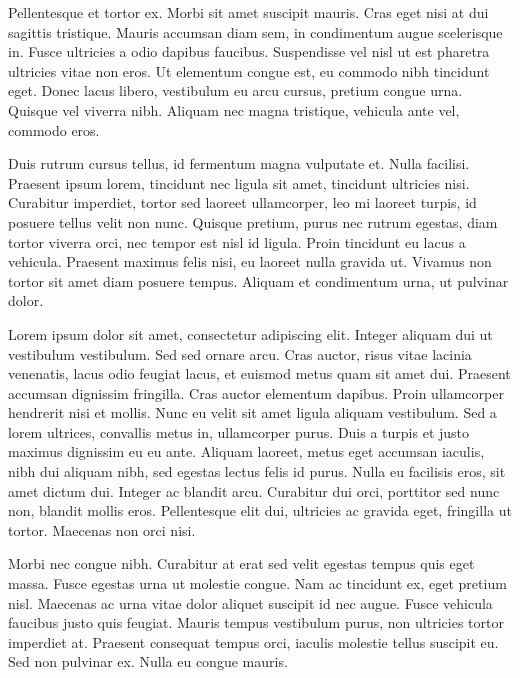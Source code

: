 Pellentesque et tortor ex. Morbi sit amet suscipit mauris. Cras eget nisi at dui sagittis tristique. Mauris accumsan diam sem, in condimentum augue scelerisque in. Fusce ultricies a odio dapibus faucibus. Suspendisse vel nisl ut est pharetra ultricies vitae non eros. Ut elementum congue est, eu commodo nibh tincidunt eget. Donec lacus libero, vestibulum eu arcu cursus, pretium congue urna. Quisque vel viverra nibh. Aliquam nec magna tristique, vehicula ante vel, commodo eros.

Duis rutrum cursus tellus, id fermentum magna vulputate et. Nulla facilisi. Praesent ipsum lorem, tincidunt nec ligula sit amet, tincidunt ultricies nisi. Curabitur imperdiet, tortor sed laoreet ullamcorper, leo mi laoreet turpis, id posuere tellus velit non nunc. Quisque pretium, purus nec rutrum egestas, diam tortor viverra orci, nec tempor est nisl id ligula. Proin tincidunt eu lacus a vehicula. Praesent maximus felis nisi, eu laoreet nulla gravida ut. Vivamus non tortor sit amet diam posuere tempus. Aliquam et condimentum urna, ut pulvinar dolor.

Lorem ipsum dolor sit amet, consectetur adipiscing elit. Integer aliquam dui ut vestibulum vestibulum. Sed sed ornare arcu. Cras auctor, risus vitae lacinia venenatis, lacus odio feugiat lacus, et euismod metus quam sit amet dui. Praesent accumsan dignissim fringilla. Cras auctor elementum dapibus. Proin ullamcorper hendrerit nisi et mollis. Nunc eu velit sit amet ligula aliquam vestibulum. Sed a lorem ultrices, convallis metus in, ullamcorper purus. Duis a turpis et justo maximus dignissim eu eu ante. Aliquam laoreet, metus eget accumsan iaculis, nibh dui aliquam nibh, sed egestas lectus felis id purus. Nulla eu facilisis eros, sit amet dictum dui. Integer ac blandit arcu. Curabitur dui orci, porttitor sed nunc non, blandit mollis eros. Pellentesque elit dui, ultricies ac gravida eget, fringilla ut tortor. Maecenas non orci nisi.

Morbi nec congue nibh. Curabitur at erat sed velit egestas tempus quis eget massa. Fusce egestas urna ut molestie congue. Nam ac tincidunt ex, eget pretium nisl. Maecenas ac urna vitae dolor aliquet suscipit id nec augue. Fusce vehicula faucibus justo quis feugiat. Mauris tempus vestibulum purus, non ultricies tortor imperdiet at. Praesent consequat tempus orci, iaculis molestie tellus suscipit eu. Sed non pulvinar ex. Nulla eu congue mauris.

